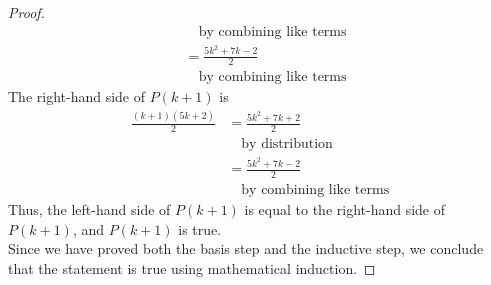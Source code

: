 \documentclass[name=Ojas\ Chaturvedi, emailid=oj.chaturvedi.2024, course=Capstone:\ Discrete\ Math, num=8, deadline={November\ 2,\ 2023}]{homework}
\begin{document}
\begin{proof}
\begin{align*}
        & \quad \text{by combining like terms} \\
        &= \frac{5k^2+7k-2}{2} \\
        & \quad \text{by combining like terms}
    \end{align*}
    The right-hand side of $P(k+1)$ is
    \begin{align*}
        \frac{(k+1)(5k+2)}{2} &= \frac{5k^2+7k+2}{2} \\
        & \quad \text{by distribution} \\
        &= \frac{5k^2+7k-2}{2} \\
        & \quad \text{by combining like terms}
    \end{align*}
    Thus, the left-hand side of $P(k+1)$ is equal to the right-hand side of $P(k+1)$, and $P(k+1)$ is true. \\
    Since we have proved both the basis step and the inductive step, we conclude that the statement is true using mathematical induction.
\end{proof}
\end{document}
